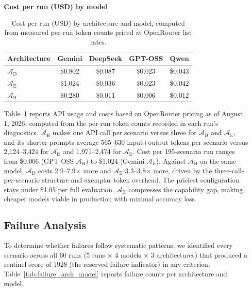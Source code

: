 \documentclass[a4paper,fleqn]{cas-dc}
\begin{document}
\begin{table}[htpb]
\begin{threeparttable}
\small
\centering
\textbf{Cost per run (USD) by model}
\renewcommand{\arraystretch}{1.15}
\begin{tabular}{lcccc}
\toprule
Architecture & Gemini & DeepSeek & GPT-OSS & Qwen \\
\midrule
$\mathcal{A}_{\text{D}}$ & \$0.802 & \$0.087 & \$0.023 & \$0.043 \\
$\mathcal{A}_{\text{E}}$ & \$1.024 & \$0.036 & \$0.023 & \$0.042 \\
$\mathcal{A}_{\text{H}}$ & \$0.280 & \$0.011 & \$0.006 & \$0.012 \\
\bottomrule
\end{tabular}
\renewcommand{\arraystretch}{1.0}
\caption{Cost per run (USD) by architecture and model, computed from measured per-run token counts priced at OpenRouter list rates.}
\label{tab:item8}
\end{threeparttable}
\end{table}

Table~\ref{tab:item8} reports API usage and costs based on OpenRouter pricing as of August 1, 2026, computed from the per-run token counts recorded in each run's diagnostics. $\mathcal{A}_{\text{H}}$ makes one API call per scenario versus three for $\mathcal{A}_{\text{D}}$ and $\mathcal{A}_{\text{E}}$, and its shorter prompts average 565--630 input+output tokens per scenario versus 2,124--3,424 for $\mathcal{A}_{\text{D}}$ and 1,971--2,474 for $\mathcal{A}_{\text{E}}$. Cost per 195-scenario run ranges from \$0.006 (GPT-OSS $\mathcal{A}_{\text{H}}$) to \$1.024 (Gemini $\mathcal{A}_{\text{E}}$). Against $\mathcal{A}_{\text{H}}$ on the same model, $\mathcal{A}_{\text{D}}$ costs 2.9--7.9$\times$ more and $\mathcal{A}_{\text{E}}$ 3.3--3.8$\times$ more, driven by the three-call-per-scenario structure and exemplar token overhead. The priciest configuration stays under \$1.05 per full evaluation. $\mathcal{A}_{\text{H}}$ compresses the capability gap, making cheaper models viable in production with minimal accuracy loss.

\FloatBarrier
\subsection{Failure Analysis}
\label{sec:res-failures}

To determine whether failures follow systematic patterns, we identified every scenario across all 60 runs (5 runs $\times$ 4 models $\times$ 3 architectures) that produced a sentinel score of 1928 (the reserved failure indicator) in any criterion. Table~\ref{tab:failure_arch_model} reports failure counts per architecture and model.
\end{document}

